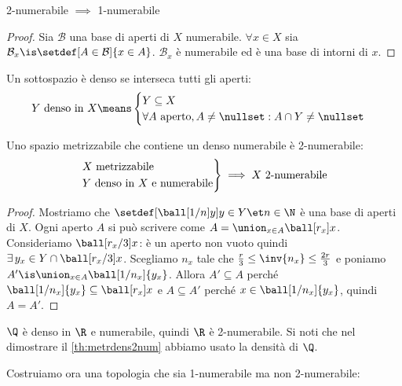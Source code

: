 
\begin{lemma}
	2-numerabile $\implies$ 1-numerabile
\end{lemma}

\begin{proof}
	Sia $\mathcal B$ una base di aperti di $X$ numerabile.
	$\forall x\in X$ sia $\mathcal B_x\is\setdef[A\in\mathcal B]{x\in A}$.
	$\mathcal B_x$ è numerabile ed è una base di intorni di $x$.
\end{proof}

\begin{defn}[Densità]
	Un sottospazio è denso se interseca tutti gli aperti:
	\[\text{$Y$ denso in $X$}\means
	\begin{cases}
		Y\subseteq X\\
		\forall A\text{ aperto},A\neq\nullset:A\cap Y\neq\nullset
	\end{cases}\]
\end{defn}

\begin{lemma}
	\label{th:metrdens2num}
	Uno spazio metrizzabile che contiene un denso numerabile è 2-numerabile:
	\[\begin{rcases}
		X\text{ metrizzabile}\\
		\text{$Y$ denso in $X$ e numerabile}
	\end{rcases}\implies
	X\text{ 2-numerabile}\]
\end{lemma}

\begin{proof}
	Mostriamo che $\setdef[{\ball[1/n]y}]{y\in Y\et n\in\N}$ è una base di aperti di $X$.
	Ogni aperto $A$ si può scrivere come $A=\union_{x\in A}\ball[r_x]x$.
	Consideriamo $\ball[r_x/3]x$: è un aperto non vuoto quindi $\exists\,y_x\in Y\cap\ball[r_x/3]x$.
	Scegliamo $n_x$ tale che $\frac r3\le\inv{n_x}\le\frac{2r}3$
	e poniamo $A'\is\union_{x\in A}\ball[1/n_x]{y_x}$.
	Allora $A'\subseteq A$ perché $\ball[1/n_x]{y_x}\subseteq\ball[r_x]x$
	e $A\subseteq A'$ perché $x\in\ball[1/n_x]{y_x}$,
	quindi $A=A'$.
\end{proof}

\begin{es}
	$\Q$ è denso in $\R$ e numerabile, quindi $\R$ è 2-numerabile.
	Si noti che nel dimostrare il \autoref{th:metrdens2num} abbiamo usato la densità di $\Q$.
\end{es}

Costruiamo ora una topologia che sia 1-numerabile ma non 2-numerabile:

